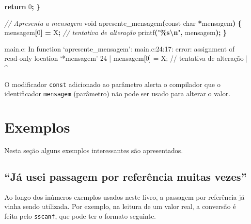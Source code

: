 \documentclass[
  11pt,
  a4paper,
]{scrbook}
\newenvironment{Shaded}{\begin{snugshade}}{\end{snugshade}}
\newcommand{\CharTok}[1]{\textcolor[rgb]{0.31,0.60,0.02}{#1}}
\newcommand{\CommentTok}[1]{\textcolor[rgb]{0.56,0.35,0.01}{\textit{#1}}}
\newcommand{\ControlFlowTok}[1]{\textcolor[rgb]{0.13,0.29,0.53}{\textbf{#1}}}
\newcommand{\DataTypeTok}[1]{\textcolor[rgb]{0.13,0.29,0.53}{#1}}
\newcommand{\DecValTok}[1]{\textcolor[rgb]{0.00,0.00,0.81}{#1}}
\newcommand{\NormalTok}[1]{#1}
\newcommand{\OperatorTok}[1]{\textcolor[rgb]{0.81,0.36,0.00}{\textbf{#1}}}
\newcommand{\SpecialCharTok}[1]{\textcolor[rgb]{0.81,0.36,0.00}{\textbf{#1}}}
\newcommand{\StringTok}[1]{\textcolor[rgb]{0.31,0.60,0.02}{#1}}
\begin{document}
\begin{tcolorbox}
\begin{Shaded}
\begin{Highlighting}[]
    \ControlFlowTok{return} \DecValTok{0}\OperatorTok{;}
\OperatorTok{\}}

\CommentTok{// Apresenta a mensagem }
\DataTypeTok{void}\NormalTok{ apresente\_mensagem}\OperatorTok{(}\DataTypeTok{const} \DataTypeTok{char} \OperatorTok{*}\NormalTok{mensagem}\OperatorTok{)} \OperatorTok{\{}
\NormalTok{    mensagem}\OperatorTok{[}\DecValTok{0}\OperatorTok{]} \OperatorTok{=} \CharTok{\textquotesingle{}X\textquotesingle{}}\OperatorTok{;}  \CommentTok{// tentativa de alteração}
\NormalTok{    printf}\OperatorTok{(}\StringTok{"}\SpecialCharTok{\%s\textbackslash{}n}\StringTok{"}\OperatorTok{,}\NormalTok{ mensagem}\OperatorTok{);}
\OperatorTok{\}}
\end{Highlighting}
\end{Shaded}

\begin{Shaded}
\begin{Highlighting}[]
\NormalTok{main.c: In function ‘apresente\_mensagem’:}
\NormalTok{main.c:24:17: error: assignment of read{-}only location ‘*mensagem’}
\NormalTok{   24 |     mensagem[0] = \textquotesingle{}X\textquotesingle{};  // tentativa de alteração}
\NormalTok{      |                 \^{}}
\end{Highlighting}
\end{Shaded}

O modificador \texttt{const} adicionado ao parâmetro alerta o compilador
que o identificador \texttt{mensagem} (parâmetro) não pode ser usado
para alterar o valor.

\end{tcolorbox}

\section{Exemplos}\label{exemplos-4}

Nesta seção alguns exemplos interessantes são apresentados.

\subsection{``Já usei passagem por referência muitas
vezes''}\label{juxe1-usei-passagem-por-referuxeancia-muitas-vezes}

Ao longo dos inúmeros exemplos usados neste livro, a passagem por
referência já vinha sendo utilizada. Por exemplo, na leitura de um valor
real, a conversão é feita pelo \texttt{sscanf}, que pode ter o formato
seguinte.
\end{document}
